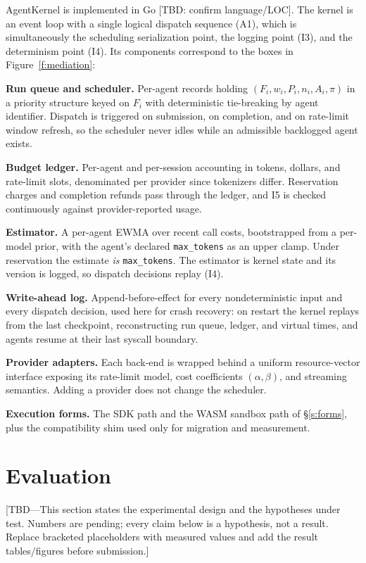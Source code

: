 \documentclass[letterpaper,11pt,leqno]{article}
\begin{document}
AgentKernel is implemented in Go {[}TBD: confirm language/LOC{]}. The kernel is an event loop with a single logical dispatch sequence (A1), which is simultaneously the scheduling serialization point, the logging point (I3), and the determinism point (I4). Its components correspond to the boxes in Figure~\ref{f:mediation}:

\textbf{Run queue and scheduler.} Per-agent records holding $(F_i, w_i, P_i, n_i, A_i, \pi)$ in a priority structure keyed on $F_i$ with deterministic tie-breaking by agent identifier. Dispatch is triggered on submission, on completion, and on rate-limit window refresh, so the scheduler never idles while an admissible backlogged agent exists.

\textbf{Budget ledger.} Per-agent and per-session accounting in tokens, dollars, and rate-limit slots, denominated per provider since tokenizers differ. Reservation charges and completion refunds pass through the ledger, and I5 is checked continuously against provider-reported usage.

\textbf{Estimator.} A per-agent EWMA over recent call costs, bootstrapped from a per-model prior, with the agent's declared \texttt{max\_tokens} as an upper clamp. Under reservation the estimate \emph{is} \texttt{max\_tokens}. The estimator is kernel state and its version is logged, so dispatch decisions replay (I4).

\textbf{Write-ahead log.} Append-before-effect for every nondeterministic input and every dispatch decision, used here for crash recovery: on restart the kernel replays from the last checkpoint, reconstructing run queue, ledger, and virtual times, and agents resume at their last syscall boundary.

\textbf{Provider adapters.} Each back-end is wrapped behind a uniform resource-vector interface exposing its rate-limit model, cost coefficients $(\alpha, \beta)$, and streaming semantics. Adding a provider does not change the scheduler.

\textbf{Execution forms.} The SDK path and the WASM sandbox path of \S\ref{s:forms}, plus the compatibility shim used only for migration and measurement.

\section{Evaluation}\label{s:evaluation}

{[}TBD---This section states the experimental design and the hypotheses under test. Numbers are pending; every claim below is a hypothesis, not a result. Replace bracketed placeholders with measured values and add the result tables/figures before submission.{]}
\end{document}
